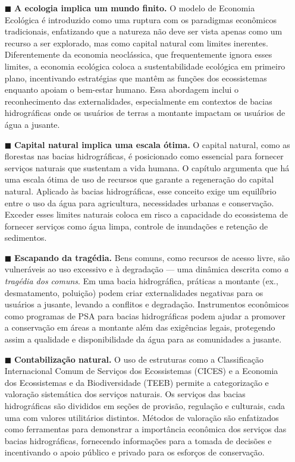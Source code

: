 \documentclass[./main.tex]{subfiles}
\begin{document}
\begin{itemize}
    
    \item[$\blacksquare$] \textbf{A ecologia implica um mundo finito.} O modelo de Economia Ecológica é introduzido como uma ruptura com os paradigmas econômicos tradicionais, enfatizando que a natureza não deve ser vista apenas como um recurso a ser explorado, mas como capital natural com limites inerentes. Diferentemente da economia neoclássica, que frequentemente ignora esses limites, a economia ecológica coloca a sustentabilidade ecológica em primeiro plano, incentivando estratégias que mantêm as funções dos ecossistemas enquanto apoiam o bem-estar humano. Essa abordagem inclui o reconhecimento das externalidades, especialmente em contextos de bacias hidrográficas onde os usuários de terras a montante impactam os usuários de água a jusante.

    \item[$\blacksquare$] \textbf{Capital natural implica uma escala ótima.} O capital natural, como as florestas nas bacias hidrográficas, é posicionado como essencial para fornecer serviços naturais que sustentam a vida humana. O capítulo argumenta que há uma escala ótima de uso de recursos que garante a regeneração do capital natural. Aplicado às bacias hidrográficas, esse conceito exige um equilíbrio entre o uso da água para agricultura, necessidades urbanas e conservação. Exceder esses limites naturais coloca em risco a capacidade do ecossistema de fornecer serviços como água limpa, controle de inundações e retenção de sedimentos.

    \item[$\blacksquare$] \textbf{Escapando da tragédia.} Bens comuns, como recursos de acesso livre, são vulneráveis ao uso excessivo e à degradação — uma dinâmica descrita como \textit{a tragédia dos comuns}. Em uma bacia hidrográfica, práticas a montante (ex., desmatamento, poluição) podem criar externalidades negativas para os usuários a jusante, levando a conflitos e degradação. Instrumentos econômicos como programas de PSA para bacias hidrográficas podem ajudar a promover a conservação em áreas a montante além das exigências legais, protegendo assim a qualidade e disponibilidade da água para as comunidades a jusante.

    \item[$\blacksquare$] \textbf{Contabilização natural.} O uso de estruturas como a Classificação Internacional Comum de Serviços dos Ecossistemas (CICES) e a Economia dos Ecossistemas e da Biodiversidade (TEEB) permite a categorização e valoração sistemática dos serviços naturais. Os serviços das bacias hidrográficas são divididos em seções de provisão, regulação e culturais, cada uma com valores utilitários distintos. Métodos de valoração são enfatizados como ferramentas para demonstrar a importância econômica dos serviços das bacias hidrográficas, fornecendo informações para a tomada de decisões e incentivando o apoio público e privado para os esforços de conservação.


\end{itemize}
\end{document}
